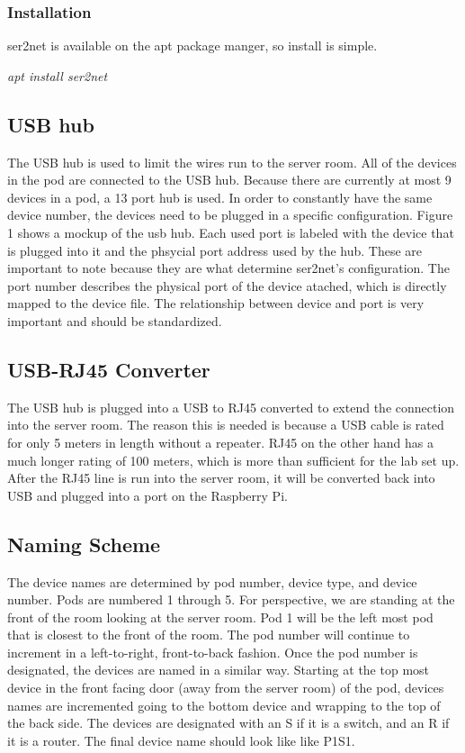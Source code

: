 \documentclass[12pt]{IEEEtran}
\begin{document}
\subsubsection{Installation}
ser2net is available on the apt package manger, so install is simple.

\textit{apt install ser2net}
\subsection{USB hub}
The USB hub is used to limit the wires run to the server room.
All of the devices in the pod are connected to the USB hub.
Because there are currently at most 9 devices in a pod, a 13 port hub is used.
In order to constantly have the same device number, the devices need to be plugged in a specific configuration.
Figure 1 shows a mockup of the usb hub.
Each used port is labeled with the device that is plugged into it and the phsycial port address used by the hub.
These are important to note because they are what determine ser2net's configuration.
The port number describes the physical port of the device atached, which is directly mapped to the device file.
The relationship between device and port is very important and should be standardized.

\subsection{USB-RJ45 Converter}
The USB hub is plugged into a USB to RJ45 converted to extend the connection into the server room.
The reason this is needed is because a USB cable is rated for only 5 meters in length without a repeater.
RJ45 on the other hand has a much longer rating of 100 meters, which is more than sufficient for the lab set up.
After the RJ45 line is run into the server room, it will be converted back into USB and plugged into a port on the Raspberry Pi.

\subsection{Naming Scheme}
The device names are determined by pod number, device type, and device number.
Pods are numbered 1 through 5.
For perspective, we are standing at the front of the room looking at the server room.
Pod 1 will be the left most pod that is closest to the front of the room.
The pod number will continue to increment in a left-to-right, front-to-back fashion.
Once the pod number is designated, the devices are named in a similar way.
Starting at the top most device in the front facing door (away from the server room) of the pod, devices names are incremented going to the bottom device and wrapping to the top of the back side.
The devices are designated with an S if it is a switch, and an R if it is a router.
The final device name should look like like P1S1.
\end{document}
